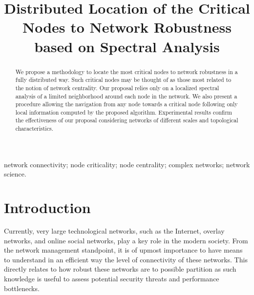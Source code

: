 \documentclass[conference,fleqn]{IEEEtran}
\begin{document}
\title{Distributed Location of the Critical Nodes to Network Robustness based on Spectral Analysis}


\author{
}













\maketitle


\begin{abstract}
We propose a methodology to locate the most critical nodes to network robustness in a fully distributed way. 
Such critical nodes may be thought of as those most related to the notion of network centrality.
Our proposal relies only
on a localized spectral analysis of a limited neighborhood around each node in the network. 
We also present a procedure allowing the navigation from any node
towards a critical node following only local information computed by the proposed algorithm. Experimental
results confirm the effectiveness of our proposal considering networks of different scales and topological characteristics.
\end{abstract}




\begin{keywords}
network connectivity; node criticality; node centrality; complex networks; network science.
\end{keywords}

\IEEEpeerreviewmaketitle

\section{Introduction}
\label{sec:Int}

Currently, very large technological networks, such as
the Internet, overlay networks, and
online social networks, play a key role in the modern
society. From the network management standpoint, it is of
upmost importance to have means to understand in an efficient way 
the level of connectivity of these networks. This directly relates to
how robust these networks are to possible partition as such knowledge 
is useful to assess potential security threats and performance bottlenecks.
\end{document}
